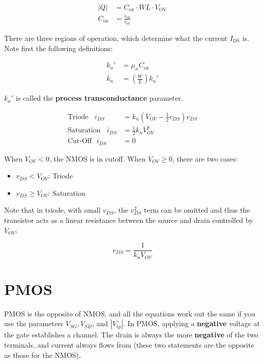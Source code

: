 \documentclass[11pt]{report}
\begin{document}
\begin{align}
	\label{eqn:nmos-channel-charge}
	|Q| &= C_{\text{ox}} \cdot W L \cdot V_{\text{OV}} \\
	C_\text{ox} &= \frac{\epsilon_\text{ox}}{t_\text{ox}}
\end{align}

 There are three regions of operation, which determine what the current $I_{\text{DS}}$ is. Note first the following definitions:

 \begin{align}
 	\label{eqn:transconductance}
 	k_n' &= \mu_nC_\text{ox} \\
 	k_n &= \left(\frac{W}{L}\right)k_n'
 \end{align}

$k_n'$ is called the \textbf{process transconductance} parameter.

 \begin{align}
 	\label{eqn:nmos-regions-of-operation}
 	\text{Triode} \ \ \ \ i_{DS} &= k_n\left(V_{OV} - \frac{1}{2}v_{DS}\right)v_{DS}\\
 	\text{Saturation} \ \ \ \ i_{DS} &= \frac{1}{2}k_nV_{OV}^2\\
 	\text{Cut-Off} \ \ \ i_{DS} &= 0
 \end{align}

 When $V_{OV} < 0$, the NMOS is in cutoff. When $V_{OV} \ge 0$, there are two cases:

 \begin{itemize}
 	\item $v_{DS} < V_{OV}$: Triode
 	\item $v_{DS} \ge V_{OV}$: Saturation
 \end{itemize}

Note that in triode, with small $v_{DS}$, the $v_{DS}^2$ term can be omitted and thus the transistor acts as a linear resistance between the source and drain controlled by $V_{OV}$:

\begin{equation}
	\label{eqn:linear-resistance-nmos}
	r_{DS} = \frac{1}{k_nV_{OV}}
\end{equation}

\section{PMOS}
PMOS is the opposite of NMOS, and all the equations work out the same if you use the parameters $V_{SG}, V_{SD}$, and $|V_{tp}|$. In PMOS, applying a \textbf{negative} voltage at the gate establishes a channel. The drain is always the more \textbf{negative} of the two terminals, and current always flows from  (these two statements are the opposite as those for the NMOS).
\end{document}
